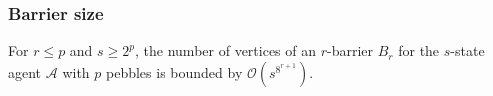 \documentclass{beamer}
\begin{document}
\begin{frame}
  \frametitle{Barrier size}
  \begin{mdframed}
    \begin{theorem}
      For $r\leq p$ and $s\geq 2^{p}$, the number of vertices of an $r$-barrier
      $B_{r}$ for the $s$-state agent $\mathcal{A}$ with $p$ pebbles is bounded
      by $\mathcal{O}(s^{8^{r+1}})$.
    \end{theorem}
  \end{mdframed}
  \begin{center}
    \resizebox{\textwidth}{!}{}
  \end{center}
\end{frame}
\end{document}
